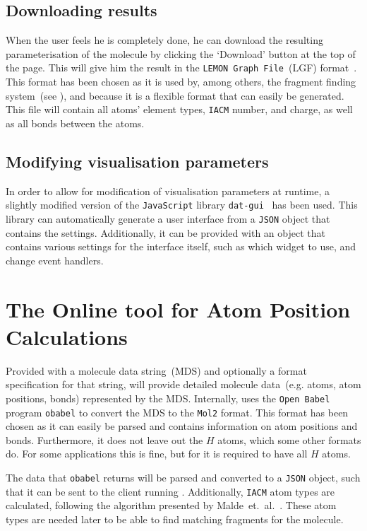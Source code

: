 \subsection{Downloading results}
When the user feels he is completely done, he can download the resulting parameterisation of the molecule by clicking the `Download' button at the top of the page. This will give him the result in the \verb|LEMON Graph File|~(LGF) format~\cite{dezso2011lemon}. This format has been chosen as it is used by, among others, the fragment finding system~(see ), and because it is a flexible format that can easily be generated. This file will contain all atoms' element types, \verb|IACM| number, and charge, as well as all bonds between the atoms.


\subsection{Modifying visualisation parameters}
In order to allow for modification of visualisation parameters at runtime, a slightly modified version of the \verb|JavaScript| library \verb|dat-gui|~\cite{data2011dat} has been used. This library can automatically generate a user interface from a \verb|JSON| object that contains the settings. Additionally, it can be provided with an object that contains various settings for the interface itself, such as which widget to use, and change event handlers.



\section[\oapoc]{The Online tool for Atom Position Calculations}
Provided with a molecule data string~(MDS) and optionally a format specification for that string, \oapoc{} will provide detailed molecule data~(e.g. atoms, atom positions, bonds) represented by the MDS. Internally, \oapoc{} uses the \verb|Open Babel| program \verb|obabel| to convert the MDS to the \verb|Mol2| format. This format has been chosen as it can easily be parsed and contains information on atom positions and bonds. Furthermore, it does not leave out the $H$ atoms, which some other formats do. For some applications this is fine, but for \oframp{} it is required to have all $H$ atoms.

The data that \verb|obabel| returns will be parsed and converted to a \verb|JSON| object, such that it can be sent to the client running \oframp. Additionally, \verb|IACM| atom types are calculated, following the algorithm presented by Malde~et.~al.~\cite{malde2011automated}. These atom types are needed later to be able to find matching fragments for the molecule.


